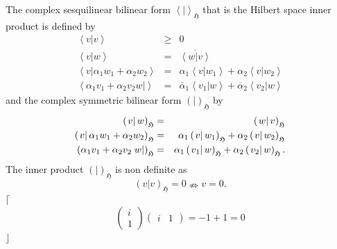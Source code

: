 \documentclass[aps,preprint]{revtex4}
\begin{document}
The complex sesquilinear bilinear form $\left\langle \left. {}\right\vert
\right\rangle _{\mathfrak{H}}$ that is the Hilbert space inner product is
defined by 
\begin{eqnarray}
\left\langle \left. v\right\vert v\right\rangle &\geq &0 \\
\left\langle \left. v\right\vert w\right\rangle &=&\overline{\left\langle
\left. w\right\vert v\right\rangle } \\
\left\langle \left. v\right\vert \alpha _{1}w_{1}+\alpha
_{2}w_{2}\right\rangle &=&\alpha _{1}\left\langle \left. v\right\vert
w_{1}\right\rangle +\alpha _{2}\left\langle \left. v\right\vert
w_{2}\right\rangle \\
\left\langle \alpha _{1}v_{1}+\alpha _{2}v_{2}\left. w\right\vert
\right\rangle &=&\overline{\alpha }_{1}\left\langle \left. v_{1}\right\vert
w\right\rangle +\overline{\alpha }_{2}\left\langle \left. v_{2}\right\vert
w\right\rangle
\end{eqnarray}%
and the complex symmetric bilinear form $\left( \left. {}\right\vert \right)
_{\mathfrak{H}}$ by 
\begin{eqnarray}
\left( \left. v\right\vert w\right) _{\mathfrak{H}} &=&\left( \left.
w\right\vert v\right) _{\mathfrak{H}} \\
\left( \left. v\right\vert \alpha _{1}w_{1}+\alpha _{2}w_{2}\right) _{%
\mathfrak{H}} &=&\alpha _{1}\left( \left. v\right\vert w_{1}\right) _{%
\mathfrak{H}}+\alpha _{2}\left( \left. v\right\vert w_{2}\right) _{\mathfrak{%
H}} \\
\left( \alpha _{1}v_{1}+\alpha _{2}v_{2}\left. w\right\vert \right) _{%
\mathfrak{H}} &=&\alpha _{1}\left( \left. v_{1}\right\vert w\right) _{%
\mathfrak{H}}+\alpha _{2}\left( \left. v_{2}\right\vert w\right) _{\mathfrak{%
H}}.
\end{eqnarray}%
The inner product $\left( \left. {}\right\vert \right) _{\mathfrak{H}}$ is
non definite as%
\begin{equation}
\left( \left. v\right\vert v\right) _{\mathfrak{H}}=0\nRightarrow v=0.
\end{equation}%
$\lceil $%
\begin{equation}
\left( 
\begin{array}{c}
i \\ 
1%
\end{array}%
\right) \left( 
\begin{array}{cc}
i & 1%
\end{array}%
\right) =-1+1=0
\end{equation}%
$\rfloor $
\end{document}
